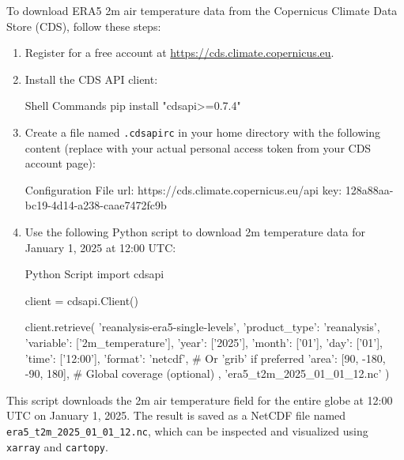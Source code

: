 To download ERA5 2m air temperature data from the Copernicus Climate Data Store (CDS), follow these steps:

\begin{enumerate}
    \item Register for a free account at \url{https://cds.climate.copernicus.eu}.
    \item Install the CDS API client:
\begin{codeonly}{Shell Commands}
pip install "cdsapi>=0.7.4"
\end{codeonly}

    \item Create a file named \texttt{.cdsapirc} in your home directory with the following content (replace with your actual personal access token from your CDS account page):
\begin{codeonly}{Configuration File}
url: https://cds.climate.copernicus.eu/api
key: 128a88aa-bc19-4d14-a238-caae7472fc9b
\end{codeonly}

    \item Use the following Python script to download 2m temperature data for January 1, 2025 at 12:00 UTC:
\begin{codeonly}{Python Script}
import cdsapi

client = cdsapi.Client()

client.retrieve(
    'reanalysis-era5-single-levels',
    {
        'product_type': 'reanalysis',
        'variable': ['2m_temperature'],
        'year': ['2025'],
        'month': ['01'],
        'day': ['01'],
        'time': ['12:00'],
        'format': 'netcdf',           # Or 'grib' if preferred
        'area': [90, -180, -90, 180], # Global coverage (optional)
    },
    'era5_t2m_2025_01_01_12.nc'
)
\end{codeonly}
\end{enumerate}

This script downloads the 2m air temperature field for the entire globe at 12:00 UTC on January 1, 2025. The result is saved as a NetCDF file named \texttt{era5\_t2m\_2025\_01\_01\_12.nc}, which can be inspected and visualized using \texttt{xarray} and \texttt{cartopy}.


